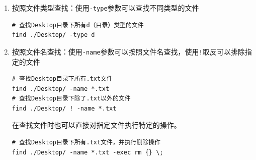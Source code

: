 \documentclass[12pt, openany, oneside]{book}
\begin{document}
\begin{enumerate}
	\item 按照文件类型查找：使用\lstinline|-type|参数可以查找不同类型的文件
	      \vspace{-0.5cm}
	      \begin{lstlisting}
# 查找Desktop目录下所有d（目录）类型的文件
find ./Desktop/ -type d
\end{lstlisting}

	      \begin{table}[H]
		      \centering
		      \caption{文件类型}
	      \end{table}

	\item 按照文件名查找：使用\lstinline|-name|参数可以按照文件名查找，使用\lstinline|!|取反可以排除指定的文件
	      \vspace{-0.5cm}
	      \begin{lstlisting}
# 查找Desktop目录下所有.txt文件
find ./Desktop/ -name *.txt
# 查找Desktop目录下除了.txt以外的文件
find ./Desktop/ ! -name *.txt
            \end{lstlisting}

	      在查找文件时也可以直接对指定文件执行特定的操作。
	      \vspace{-0.5cm}
	      \begin{lstlisting}
# 查找Desktop目录下所有.txt文件，并执行删除操作
find ./Desktop/ -name *.txt -exec rm {} \;
            \end{lstlisting}
\end{enumerate}
\end{document}
